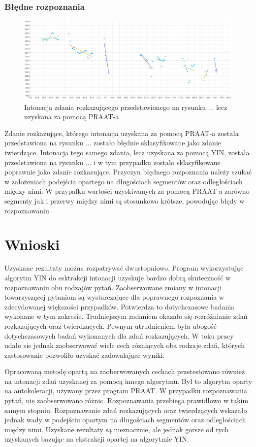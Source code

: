 \documentclass[a4paper,12 pt]{report}
\begin{document}
\subsection{Błędne rozpoznania}
\begin{figure}[h]
\centering
\includegraphics[scale=0.7]{rozkaz_1_praat_zle.png}
\caption{Intonacja zdania rozkazującego przedstawionego na rysunku ... lecz uzyskana za pomocą PRAAT-a}
\end{figure}
\FloatBarrier
Zdanie rozkazujące, którego intonacja uzyskana za pomocą PRAAT-a została przedstawiona na rysunku ... zostało błędnie sklasyfikowane jako zdanie twierdzące. Intonacja tego samego zdania, lecz uzyskana za pomocą YIN, została przedstawiona na rysunku ... i w tym przypadku zostało sklasyfikowane poprawnie jako zdanie rozkazujące. Przyczyn błędnego rozpoznania należy szukać w założeniach podejścia opartego na długościach segmentów oraz odległościach między nimi. W przypafku wartości uzyskiwanych za pomocą PRAAT-a zarówno segmenty jak i przerwy między nimi są stosunkowo krótsze, powodując błędy w rozpoznawaniu.
\chapter{Wnioski}
Uzyskane rezultaty można rozpatrywać dwustopniowo. Program wykorzystując algorytm YIN do esktrakcji intonacji uzyskuje bardzo dobrą skuteczność w rozpoznawaniu obu rodzajów pytań. Zaobserwowane zmiany w intonacji towarzyszącej pytaniom są wystarczające dla poprawnego rozpoznania w zdecydowanej większości przypadków. Potwierdza to dotychczasowe badania wykonane w tym zakresie. 
Trudniejszym zadaniem okazało się rozróżnianie zdań rozkazujących oraz twierdzących. Pewnym utrudnieniem była ubogość dotychczasowych badań wykonanych dla zdań rozkazujących. W toku pracy udało sie jednak zaobserwować wiele cech rózniących oba rodzaje zdań, których zastosowanie pozwoliło uzyskać zadowalające wyniki.

Opracowaną metodę opartą na zaoberwowanych cechach przetestowano również na intonacji zdań uzyskanej za pomocą innego algorytmu. Był to algorytm oparty na autokoleracji, używany przez program PRAAT.
W przypadku rozpoznawania pytań, nie zaobserwowano różnic. Rozpoznawania przebiega prawidłowo w takim samym stopniu.
Rozpoznawanie zdań rozkazujących oraz twierdzących wskazało jednak wady w podejściu opartym na długościach segmentów oraz odległościach między nimi. Uzyskane rezultaty są nieznacznie, ale jednak gorsze od tych uzyskanych bazując na ekstrakcji opartej na algorytmie YIN.
\end{document}
